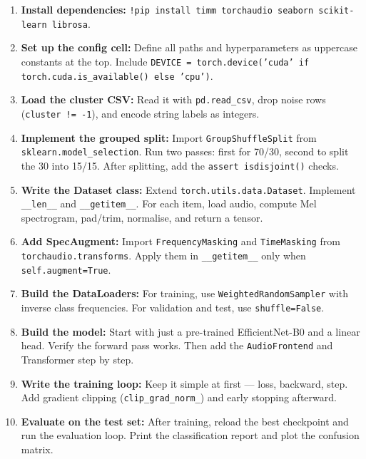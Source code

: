 \documentclass[12pt,a4paper]{article}
\begin{document}
\begin{enumerate}
  \item \textbf{Install dependencies:} \texttt{!pip install timm torchaudio seaborn scikit-learn librosa}.

  \item \textbf{Set up the config cell:} Define all paths and hyperparameters as uppercase constants at the top. Include \texttt{DEVICE = torch.device('cuda' if torch.cuda.is\_available() else 'cpu')}.

  \item \textbf{Load the cluster CSV:} Read it with \texttt{pd.read\_csv}, drop noise rows (\texttt{cluster != -1}), and encode string labels as integers.

  \item \textbf{Implement the grouped split:} Import \texttt{GroupShuffleSplit} from \texttt{sklearn.model\_selection}. Run two passes: first for 70/30, second to split the 30 into 15/15. After splitting, add the \texttt{assert isdisjoint()} checks.

  \item \textbf{Write the Dataset class:} Extend \texttt{torch.utils.data.Dataset}. Implement \texttt{\_\_len\_\_} and \texttt{\_\_getitem\_\_}. For each item, load audio, compute Mel spectrogram, pad/trim, normalise, and return a tensor.

  \item \textbf{Add SpecAugment:} Import \texttt{FrequencyMasking} and \texttt{TimeMasking} from \texttt{torchaudio.transforms}. Apply them in \texttt{\_\_getitem\_\_} only when \texttt{self.augment=True}.

  \item \textbf{Build the DataLoaders:} For training, use \texttt{WeightedRandomSampler} with inverse class frequencies. For validation and test, use \texttt{shuffle=False}.

  \item \textbf{Build the model:} Start with just a pre-trained EfficientNet-B0 and a linear head. Verify the forward pass works. Then add the \texttt{AudioFrontend} and Transformer step by step.

  \item \textbf{Write the training loop:} Keep it simple at first --- loss, backward, step. Add gradient clipping (\texttt{clip\_grad\_norm\_}) and early stopping afterward.

  \item \textbf{Evaluate on the test set:} After training, reload the best checkpoint and run the evaluation loop. Print the classification report and plot the confusion matrix.
\end{enumerate}
\end{document}
